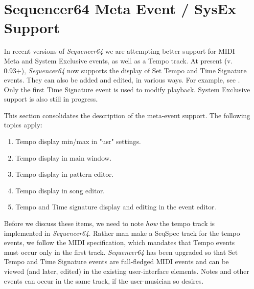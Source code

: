 %
%
%

\section{Sequencer64 Meta Event / SysEx Support}
\label{sec:meta_events}

   In recent versions of \textsl{Sequencer64} we are attempting better support
   for MIDI Meta and System Exclusive events, as well as a Tempo track.
   At present (v. 0.93+), \textsl{Sequencer64} now supports the display of Set
   Tempo and Time Signature events.  They can also be added and edited, in
   various ways.  For example, see .
   Only the first Time Signature event is used to modify playback.
   System Exclusive support is also still in progress.

   This section consolidates the description of the meta-event support.
   The following topics apply:

   \begin{enumerate}
      \item Tempo display min/max in "usr" settings.
      \item Tempo display in main window.
      \item Tempo display in pattern editor.
      \item Tempo display in song editor.
      \item Tempo and Time signature display and editing in the event editor.
   \end{enumerate}

   Before we discuss these items, we need to note \textsl{how} the tempo track is
   implemented in \textsl{Sequencer64}.  Rather man make a SeqSpec track for
   the tempo events, we follow the MIDI specification, which mandates that
   Tempo events must occur only in the first track.  \textsl{Sequencer64} has
   been upgraded so that Set Tempo and Time Signature events are full-fledged
   MIDI events and can be viewed (and later, edited) in the existing
   user-interface elements.  Notes and other events can occur in the same
   track, if the user-musician so desires.

